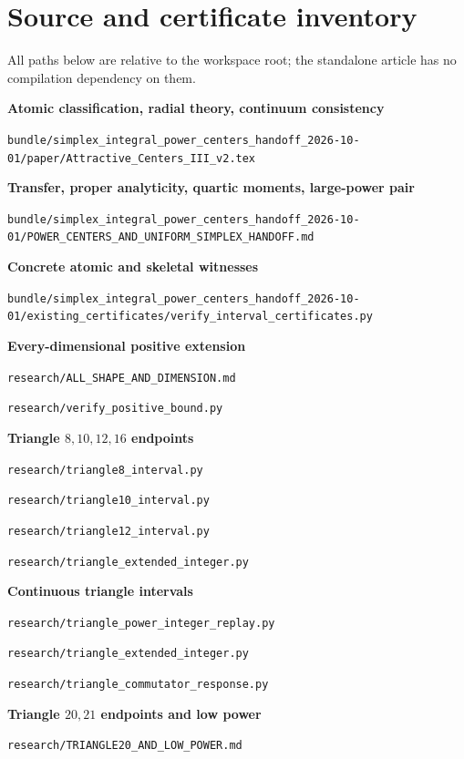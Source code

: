 \documentclass[11pt]{article}
\theoremstyle{definition}
\newcommand{\pathcode}[1]{\nolinkurl{#1}}
\begin{document}
\section{Source and certificate inventory}
All paths below are relative to the workspace root; the standalone article
has no compilation dependency on them.\par\medskip
\begingroup\small\raggedright
\noindent\textbf{Atomic classification, radial theory, continuum consistency}\par\nopagebreak[4]
\pathcode{bundle/simplex_integral_power_centers_handoff_2026-10-01/paper/Attractive_Centers_III_v2.tex}\par\medskip
\noindent\textbf{Transfer, proper analyticity, quartic moments, large-power pair}\par\nopagebreak[4]
\pathcode{bundle/simplex_integral_power_centers_handoff_2026-10-01/POWER_CENTERS_AND_UNIFORM_SIMPLEX_HANDOFF.md}\par\medskip
\noindent\textbf{Concrete atomic and skeletal witnesses}\par\nopagebreak[4]
\pathcode{bundle/simplex_integral_power_centers_handoff_2026-10-01/existing_certificates/verify_interval_certificates.py}\par\medskip
\noindent\textbf{Every-dimensional positive extension}\par\nopagebreak[4]
\pathcode{research/ALL_SHAPE_AND_DIMENSION.md}\par
\pathcode{research/verify_positive_bound.py}\par\medskip
\noindent\textbf{Triangle $8,10,12,16$ endpoints}\par\nopagebreak[4]
\pathcode{research/triangle8_interval.py}\par
\pathcode{research/triangle10_interval.py}\par
\pathcode{research/triangle12_interval.py}\par
\pathcode{research/triangle_extended_integer.py}\par\medskip
\noindent\textbf{Continuous triangle intervals}\par\nopagebreak[4]
\pathcode{research/triangle_power_integer_replay.py}\par
\pathcode{research/triangle_extended_integer.py}\par
\pathcode{research/triangle_commutator_response.py}\par\medskip
\noindent\textbf{Triangle $20,21$ endpoints and low power}\par\nopagebreak[4]
\pathcode{research/TRIANGLE20_AND_LOW_POWER.md}\par
\end{document}
